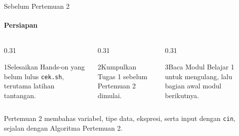 \documentclass[t]{beamer}
\begin{document}
\begin{frame}{Sebelum Pertemuan 2}
\framesubtitle{Persiapan}
\begin{columns}[T]
\begin{column}{0.31\textwidth}
\begin{Langkah}{1}{Selesaikan}
Hands-on yang belum lulus \texttt{cek.sh}, terutama latihan tantangan.
\end{Langkah}
\end{column}
\begin{column}{0.31\textwidth}
\begin{Langkah}{2}{Kumpulkan}
Tugas 1 sebelum Pertemuan 2 dimulai.
\end{Langkah}
\end{column}
\begin{column}{0.31\textwidth}
\begin{Langkah}{3}{Baca}
Modul Belajar 1 untuk mengulang, lalu bagian awal modul berikutnya.
\end{Langkah}
\end{column}
\end{columns}
\vspace{10pt}
Pertemuan 2 membahas variabel, tipe data, ekspresi, serta input dengan \texttt{cin}, sejalan dengan Algoritma Pertemuan 2.
\end{frame}

\end{document}
